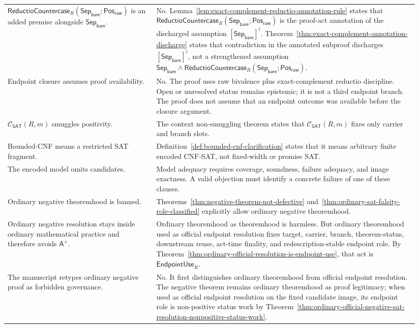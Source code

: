 \documentclass[11pt]{article}
\theoremstyle{definition}
\theoremstyle{remark}
\newcommand{\PosRaw}{\mathsf{Pos}_{\mathsf{raw}}}
\newcommand{\SepBare}{\mathsf{Sep}_{\mathsf{bare}}}
\newcommand{\Aplus}{\mathsf{A}^{+}}
\newcommand{\ClayCtx}{\mathcal{C}_{\mathsf{SAT}}(R,m)}
\newcommand{\EndpointUse}{\mathsf{EndpointUse}}
\newcommand{\ReductioCountercase}{\mathsf{ReductioCountercase}}
\begin{document}
{\begin{longtable}{>{\raggedright\arraybackslash}p{0.34\linewidth}>{\raggedright\arraybackslash}p{0.60\linewidth}}
\(\ReductioCountercase_R(\SepBare;\PosRaw)\) is an added premise alongside \(\SepBare\). & No. Lemma~\ref{lem:exact-complement-reductio-annotation-rule} states that \(\ReductioCountercase_R(\SepBare;\PosRaw)\) is the proof-act annotation of the discharged assumption \([\SepBare]^i\). Theorem~\ref{thm:exact-complement-annotation-discharge} states that contradiction in the annotated subproof discharges \([\SepBare]^i\), not a strengthened assumption \(\SepBare\wedge\ReductioCountercase_R(\SepBare;\PosRaw)\). \\
Endpoint closure assumes proof availability. & No. The proof uses raw bivalence plus exact-complement reductio discipline. Open or unresolved status remains epistemic; it is not a third endpoint branch. The proof does not assume that an endpoint outcome was available before the closure argument. \\
\(\ClayCtx\) smuggles positivity. & The context non-smuggling theorem states that \(\ClayCtx\) fixes only carrier and branch slots. \\
Bounded-CNF means a restricted SAT fragment. & Definition~\ref{def:bounded-cnf-clarification} states that it means arbitrary finite encoded CNF-SAT, not fixed-width or promise SAT. \\
The encoded model omits candidates. & Model adequacy requires coverage, soundness, failure adequacy, and image exactness. A valid objection must identify a concrete failure of one of these clauses. \\
Ordinary negative theoremhood is banned. & Theorems~\ref{thm:negative-theorem-not-defective} and~\ref{thm:ordinary-sat-falsity-role-classified} explicitly allow ordinary negative theoremhood. \\
Ordinary negative resolution stays inside ordinary mathematical practice and therefore avoids \(\Aplus\). & Ordinary theoremhood as theoremhood is harmless. But ordinary theoremhood used as official endpoint resolution fixes target, carrier, branch, theorem-status, downstream reuse, act-time finality, and redescription-stable endpoint role. By Theorem~\ref{thm:ordinary-official-resolution-is-endpoint-use}, that act is \(\EndpointUse_R\). \\
The manuscript retypes ordinary negative proof as forbidden governance. & No. It first distinguishes ordinary theoremhood from official endpoint resolution. The negative theorem remains ordinary theoremhood as proof legitimacy; when used as official endpoint resolution on the fixed candidate image, its endpoint role is non-positive status work by Theorem~\ref{thm:ordinary-official-negative-sat-resolution-nonpositive-status-work}. \\

\end{longtable}}
\end{document}
